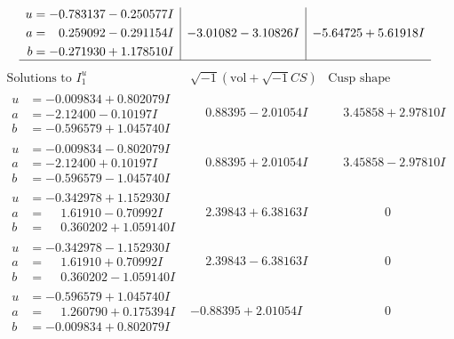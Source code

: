 \documentclass[1p]{elsarticle_modified}
\theoremstyle{definition}
\newcommand{\I}{\sqrt{-1}}
\begin{document}
$$\begin{array}{c|c|c}
\begin{aligned}
u &= -0.783137 - 0.250577 I \\
a &= \phantom{-}0.259092 - 0.291154 I \\
b &= -0.271930 + 1.178510 I\end{aligned}
 & -3.01082 - 3.10826 I & -5.64725 + 5.61918 I\\
 \hline 
 \end{array}$$\newpage$$\begin{array}{c|c|c}  
\text{Solutions to }I^u_{1}& \I (\text{vol} + \sqrt{-1}CS) & \text{Cusp shape}\\
 \hline 
\begin{aligned}
u &= -0.009834 + 0.802079 I \\
a &= -2.12400 - 0.10197 I \\
b &= -0.596579 + 1.045740 I\end{aligned}
 & \phantom{-}0.88395 - 2.01054 I & \phantom{-}3.45858 + 2.97810 I \\ \hline\begin{aligned}
u &= -0.009834 - 0.802079 I \\
a &= -2.12400 + 0.10197 I \\
b &= -0.596579 - 1.045740 I\end{aligned}
 & \phantom{-}0.88395 + 2.01054 I & \phantom{-}3.45858 - 2.97810 I \\ \hline\begin{aligned}
u &= -0.342978 + 1.152930 I \\
a &= \phantom{-}1.61910 - 0.70992 I \\
b &= \phantom{-}0.360202 + 1.059140 I\end{aligned}
 & \phantom{-}2.39843 + 6.38163 I & \phantom{-0.000000 } 0 \\ \hline\begin{aligned}
u &= -0.342978 - 1.152930 I \\
a &= \phantom{-}1.61910 + 0.70992 I \\
b &= \phantom{-}0.360202 - 1.059140 I\end{aligned}
 & \phantom{-}2.39843 - 6.38163 I & \phantom{-0.000000 } 0 \\ \hline\begin{aligned}
u &= -0.596579 + 1.045740 I \\
a &= \phantom{-}1.260790 + 0.175394 I \\
b &= -0.009834 + 0.802079 I\end{aligned}
 & -0.88395 + 2.01054 I & \phantom{-0.000000 } 0 \\ \hline\begin{aligned}

\end{aligned}
\end{array}$$
\end{document}
